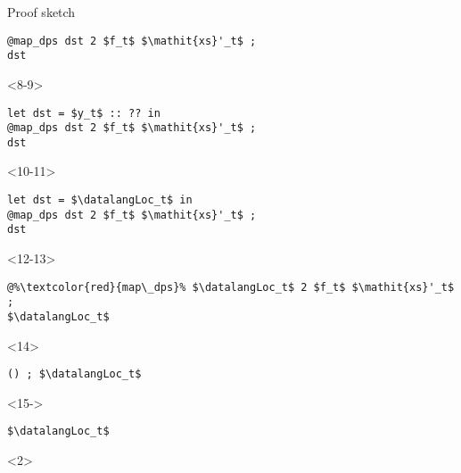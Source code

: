 \begin{frame}[fragile]{Proof sketch}
\begin{minipage}{.4\columnwidth}
\begin{onlyenv}
\begin{lstlisting}
@map_dps dst 2 $f_t$ $\mathit{xs}'_t$ ;
dst
        \end{lstlisting}
    \end{onlyenv}
    \begin{onlyenv}<8-9>
        \begin{lstlisting}
let dst = $y_t$ :: ?? in
@map_dps dst 2 $f_t$ $\mathit{xs}'_t$ ;
dst
        \end{lstlisting}
    \end{onlyenv}
    \begin{onlyenv}<10-11>
        \begin{lstlisting}
let dst = $\datalangLoc_t$ in
@map_dps dst 2 $f_t$ $\mathit{xs}'_t$ ;
dst
        \end{lstlisting}
    \end{onlyenv}
    \begin{onlyenv}<12-13>
        \begin{lstlisting}
@%\textcolor{red}{map\_dps}% $\datalangLoc_t$ 2 $f_t$ $\mathit{xs}'_t$ ;
$\datalangLoc_t$
        \end{lstlisting}
    \end{onlyenv}
    \begin{onlyenv}<14>
        \begin{lstlisting}
() ; $\datalangLoc_t$
        \end{lstlisting}
    \end{onlyenv}
    \begin{onlyenv}<15->
        \begin{lstlisting}
$\datalangLoc_t$
        \end{lstlisting}
    \end{onlyenv}
\end{minipage}
\begin{overbox}<2>
    \begin{mathpar}
\end{mathpar}
\end{overbox}
\end{frame}
